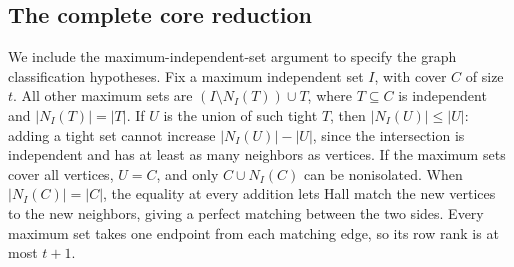 \documentclass[10pt]{article}
\begin{document}
\subsection{The complete core reduction}
We include the maximum-independent-set argument to specify the graph
classification hypotheses. Fix a maximum independent set $I$, with cover
$C$ of size $t$. All other maximum sets are $(I\setminus N_I(T))\cup T$,
where $T\subseteq C$ is independent and $|N_I(T)|=|T|$. If $U$ is the union
of such tight $T$, then $|N_I(U)|\le|U|$: adding a tight set cannot increase
$|N_I(U)|-|U|$, since the intersection is independent and has at least as
many neighbors as vertices. If the maximum sets cover all vertices,
$U=C$, and only $C\cup N_I(C)$ can be nonisolated. When
$|N_I(C)|=|C|$, the equality at every addition lets Hall match the new
vertices to the new neighbors, giving a perfect matching between the two
sides. Every maximum set takes one endpoint from each matching edge, so
its row rank is at most $t+1$.
\end{document}
